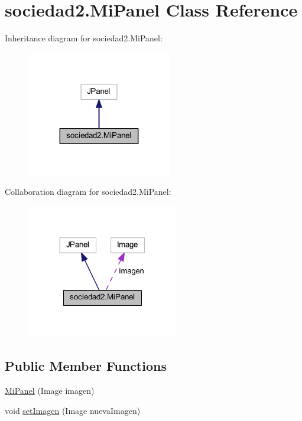 \hypertarget{classsociedad2_1_1_mi_panel}{}\section{sociedad2.\+Mi\+Panel Class Reference}
\label{classsociedad2_1_1_mi_panel}


Inheritance diagram for sociedad2.\+Mi\+Panel\+:
\nopagebreak
\begin{figure}[H]
\begin{center}
\leavevmode
\includegraphics[width=179pt]{classsociedad2_1_1_mi_panel__inherit__graph}
\end{center}
\end{figure}


Collaboration diagram for sociedad2.\+Mi\+Panel\+:
\nopagebreak
\begin{figure}[H]
\begin{center}
\leavevmode
\includegraphics[width=188pt]{classsociedad2_1_1_mi_panel__coll__graph}
\end{center}
\end{figure}
\subsection*{Public Member Functions}
\begin{DoxyCompactItemize}
\item 
\mbox{\hyperlink{classsociedad2_1_1_mi_panel_a728fc4503e18ffec92d5391ef75f7f40}{Mi\+Panel}} (Image imagen)
\item 
void \mbox{\hyperlink{classsociedad2_1_1_mi_panel_a94a0438f3a9cdbb34b254eed58037304}{set\+Imagen}} (Image nueva\+Imagen)
\end{DoxyCompactItemize}
